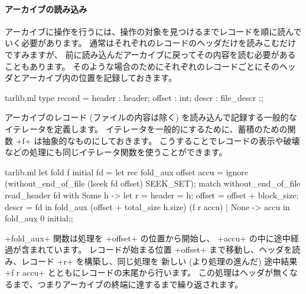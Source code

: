 \paragraph{アーカイブの読み込み}
アーカイブに操作を行うには、操作の対象を見つけるまでレコードを順に読んでいく必要があります。
通常はそれぞれのレコードのヘッダだけを読みこむだけですみますが、
前に読み込んだアーカイブに戻ってその内容を読む必要があることもあります。
そのような場合のためにそれぞれのレコードごとにそのヘッダとアーカイブ内の位置を記録しておきます。
%
\begin{listingcodefile}{tarlib.ml}
type record = { header : header; offset : int; descr : file_descr };;
\end{listingcodefile}
%
アーカイブのレコード (ファイルの内容は除く) を読み込んで記録する一般的なイテレータを定義します。
イテレータを一般的にするために、蓄積のための関数 \ml+f+ は抽象的なものにしておきます。
こうすることでレコードの表示や破壊などの処理にも同じイテレータ関数を使うことができます。
%
\begin{listingcodefile}{tarlib.ml}
let fold f initial fd  =
  let rec fold_aux offset accu =
    ignore (without_end_of_file (lseek fd offset) SEEK_SET);
    match without_end_of_file read_header fd with
      Some h ->
        let r =
          { header = h; offset = offset + block_size; descr = fd } in
        fold_aux (offset + total_size h.size) (f r accu)
    | None -> accu in
  fold_aux 0 initial;;
\end{listingcodefile}
%
\ml+fold_aux+ 関数は処理を \ml+offset+ の位置から開始し、 \ml+accu+ の中に途中経過が含まれています。
レコードが始まる位置 \ml+offset+ まで移動し、ヘッダを読み、レコード \ml+r+ を構築し、同じ処理を
新しい (より処理の進んだ) 途中結果 \ml+f r accu+ とともにレコードの末尾から行います。
この処理はヘッダが無くなるまで、つまりアーカイブの終端に達するまで繰り返されます。

